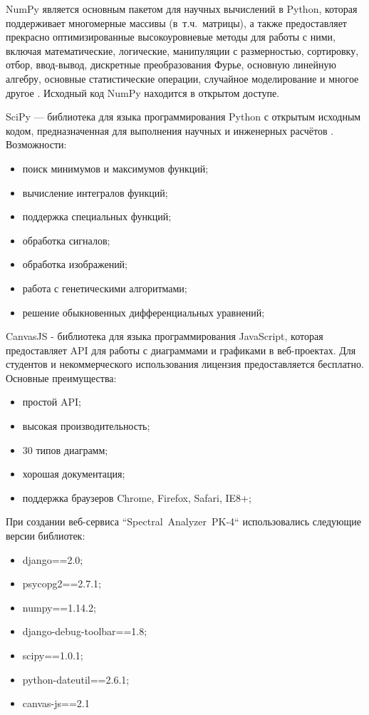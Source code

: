 NumPy является основным пакетом для научных вычислений в Python, которая поддерживает
многомерные массивы (в~т.ч.~матрицы), а также предоставляет прекрасно оптимизированные высокоуровневые методы для работы с ними,
включая математические, логические, манипуляции с размерностью, сортировку, отбор, ввод-вывод, дискретные преобразования Фурье,
основную линейную алгебру, основные статистические операции, случайное моделирование и многое другое \cite{Numpy}.
Исходный код NumPy находится в открытом доступе.

SciPy — библиотека для языка программирования Python с открытым исходным кодом, предназначенная для выполнения научных и
инженерных расчётов \cite{Scipy}. Возможности:
\begin{itemize}
\item поиск минимумов и максимумов функций;
\item вычисление интегралов функций;
\item поддержка специальных функций;
\item обработка сигналов;
\item обработка изображений;
\item работа с генетическими алгоритмами;
\item решение обыкновенных дифференциальных уравнений;
\end{itemize}

CanvasJS - библиотека для языка программирования JavaScript, которая предоставляет API для работы с диаграммами и графиками
в веб-проектах. Для студентов и некоммерческого использования лицензия предоставляется бесплатно. Основные преимущества:
\begin{itemize}
\item простой API;
\item высокая производительность;
\item 30 типов диаграмм;
\item хорошая документация;
\item поддержка браузеров Chrome, Firefox, Safari, IE8+;
\end{itemize}

При создании веб-сервиса “Spectral~Analyzer~PK-4“ использовались следующие версии библиотек:
\begin{itemize}
\item django==2.0;
\item psycopg2==2.7.1;
\item numpy==1.14.2;
\item django-debug-toolbar==1.8;
\item scipy==1.0.1;
\item python-dateutil==2.6.1;
\item canvas-js==2.1
\end{itemize}

